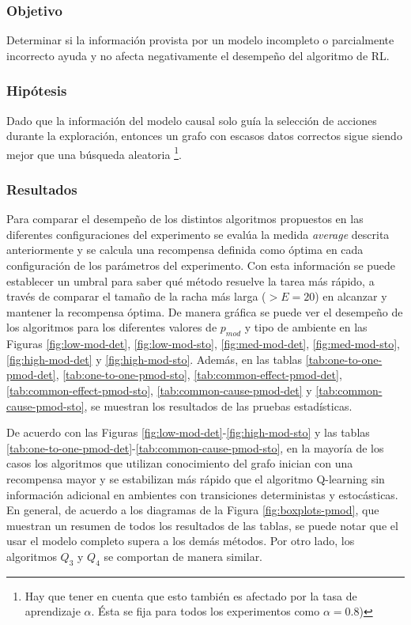 \subsubsection{Objetivo}

Determinar si la información provista por un modelo
incompleto o parcialmente incorrecto ayuda y no
afecta negativamente el desempeño del algoritmo de RL.

\subsubsection{Hipótesis}

Dado que la información del modelo causal solo guía la selección
de acciones durante la exploración, entonces un grafo con escasos
datos correctos sigue siendo mejor que una búsqueda aleatoria \footnote{Hay que tener en cuenta que esto también es afectado por la tasa
de aprendizaje $\alpha$. Ésta se fija para todos los experimentos como $\alpha = 0.8$)}.


\subsubsection{Resultados}

Para comparar el desempeño de los distintos algoritmos propuestos
en las diferentes configuraciones del experimento
se evalúa la medida \textit{average} descrita anteriormente y se calcula una recompensa definida como óptima en cada configuración de los parámetros del experimento. Con esta información se puede establecer un umbral para saber qué método resuelve la tarea más rápido, a través de comparar el tamaño de la racha más larga ($>E=20$) en alcanzar y mantener la recompensa óptima.
De manera gráfica se puede ver el desempeño de los algoritmos
para los diferentes valores de $p_{mod}$ y tipo de ambiente en las Figuras \ref{fig:low-mod-det}, \ref{fig:low-mod-sto}, \ref{fig:med-mod-det}, \ref{fig:med-mod-sto},  \ref{fig:high-mod-det} y \ref{fig:high-mod-sto}. Además, en las tablas \ref{tab:one-to-one-pmod-det}, \ref{tab:one-to-one-pmod-sto}, \ref{tab:common-effect-pmod-det}, \ref{tab:common-effect-pmod-sto},
\ref{tab:common-cause-pmod-det} y \ref{tab:common-cause-pmod-sto}, se muestran los resultados de las pruebas estadísticas.


De acuerdo con las Figuras \ref{fig:low-mod-det}-\ref{fig:high-mod-sto} y las tablas
\ref{tab:one-to-one-pmod-det}-\ref{tab:common-cause-pmod-sto},
en la mayoría de los casos los algoritmos que utilizan conocimiento del grafo inician con una recompensa mayor y se estabilizan más rápido que el algoritmo Q-learning
sin información adicional en ambientes con transiciones deterministas y estocásticas.
En general, de acuerdo a los diagramas de la Figura \ref{fig:boxplots-pmod}, que muestran un resumen
de todos los resultados de las tablas, se puede notar que el 
usar el modelo completo supera a los demás métodos. Por otro lado, los
algoritmos $Q_3$ y $Q_4$ se comportan de manera similar.

